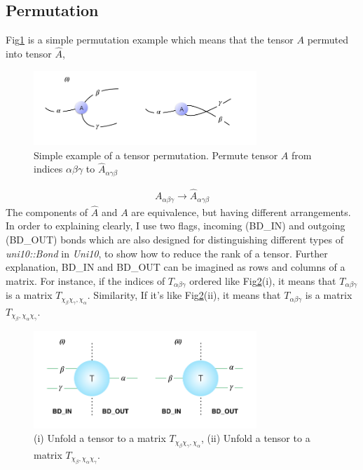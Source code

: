 \subsection{Permutation}
Fig\ref{fig224} is a simple permutation example which means that the tensor $A$ permuted into tensor $\hat{A}$, 
	\begin{figure}[ht]
	\centering
	\includegraphics[width=0.75\textwidth]{figures/fig224.png}
	\caption[The process of permuting a tensor.]{Simple example of a tensor permutation. Permute tensor $A$ from indices $\alpha \beta \gamma$ to $\hat{A}_{\alpha \gamma \beta}$ }
	\label{fig224}
	\end{figure}
\begin{align}
	A_{\alpha \beta \gamma} \rightarrow \hat{A}_{\alpha \gamma \beta}
\end{align}
The components of $\hat{A}$ and $A$ are equivalence, but having different arrangements.
In order to explaining clearly, I use two flags, incoming (BD\_IN) and outgoing (BD\_OUT) bonds which are also designed for distinguishing different types of \textit{uni10::Bond} in \textit{Uni10}, to show how to reduce the rank of a tensor. Further explanation, BD\_IN and BD\_OUT can be imagined as rows and columns of a matrix. For instance, if the indices of $T_{\alpha \beta \gamma}$ ordered like Fig\ref{fig221}(i), it means that $T_{\alpha \beta \gamma}$ is a matrix $T_{\chi_{\beta}\chi_{\gamma},\chi_{\alpha}}$. Similarity, If it's like Fig\ref{fig221}(ii), it means that $T_{\alpha \beta \gamma}$ is a matrix $T_{\chi_{\beta},\chi_{\alpha}\chi_{\gamma}}$.
	\begin{figure}[ht]
	\centering
	\includegraphics[width=0.75\textwidth]{figures/fig221.png}
	\caption[Representaion of unfold tensors.]{(i) Unfold a tensor to a matrix $T_{\chi_{\beta}\chi_{\gamma},\chi_{\alpha}}$, (ii) Unfold a tensor to a matrix $T_{\chi_{\beta},\chi_{\alpha}\chi_{\gamma}}$.}
	\label{fig221}
	\end{figure}
